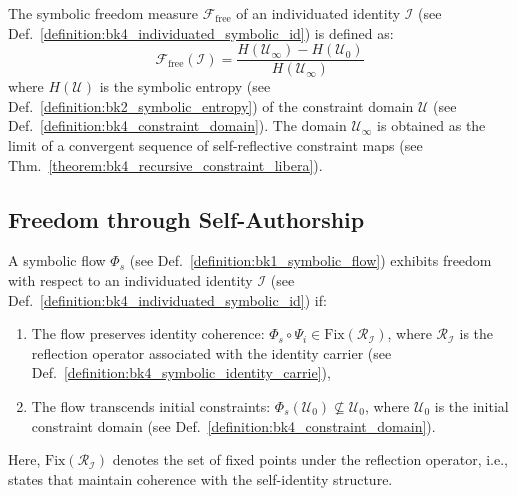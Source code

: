 \begin{definition}
\label{definition:bk4_symbolic_freedom_measure}
The symbolic freedom measure $\mathcal{F}_{\text{free}}$ of an individuated identity $\mathcal{I}$ (see Def.~\ref{definition:bk4_individuated_symbolic_id}) is defined as:
\begin{equation}
    \mathcal{F}_{\text{free}}(\mathcal{I}) = \frac{H(\mathcal{U}_{\infty}) - H(\mathcal{U}_0)}{H(\mathcal{U}_{\infty})}
\end{equation}
where $H(\mathcal{U})$ is the symbolic entropy (see Def.~\ref{definition:bk2_symbolic_entropy}) of the constraint domain $\mathcal{U}$ (see Def.~\ref{definition:bk4_constraint_domain}). The domain $\mathcal{U}_{\infty}$ is obtained as the limit of a convergent sequence of self-reflective constraint maps (see Thm.~\ref{theorem:bk4_recursive_constraint_libera}).
\end{definition}
\subsection{Freedom through Self-Authorship}
\begin{definition}
\label{definition:bk4_symbolic_flow_freedom}
A symbolic flow $\Phi_s$ (see Def.~\ref{definition:bk1_symbolic_flow}) exhibits freedom with respect to an individuated identity $\mathcal{I}$ (see Def.~\ref{definition:bk4_individuated_symbolic_id}) if:
\begin{enumerate}
    \item The flow preserves identity coherence: $\Phi_s \circ \Psi_i \in \text{Fix}(\mathcal{R}_{\mathcal{I}})$, where $\mathcal{R}_{\mathcal{I}}$ is the reflection operator associated with the identity carrier (see Def.~\ref{definition:bk4_symbolic_identity_carrie}),
    \item The flow transcends initial constraints: $\Phi_s(\mathcal{U}_0) \not\subseteq \mathcal{U}_0$, where $\mathcal{U}_0$ is the initial constraint domain (see Def.~\ref{definition:bk4_constraint_domain}).
\end{enumerate}
Here, $\text{Fix}(\mathcal{R}_{\mathcal{I}})$ denotes the set of fixed points under the reflection operator, i.e., states that maintain coherence with the self-identity structure.
\end{definition}

